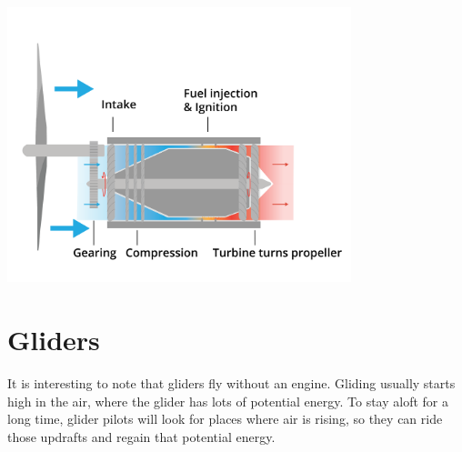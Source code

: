 \begin{center}
    
    \includegraphics[width=0.75\textwidth]{turboProp.png}
    
\end{center}

\section{Gliders}

It is interesting to note that gliders fly without an engine. Gliding usually starts high in the air,  where the glider has lots of potential energy. To stay aloft for a long
time, glider pilots will look for places where air is rising, so they can ride those updrafts and regain that potential energy.

